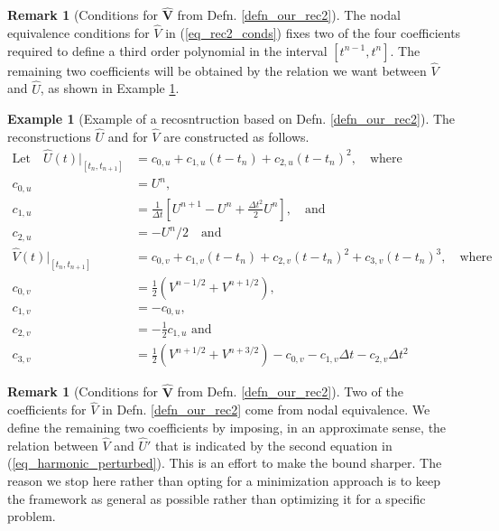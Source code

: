 \documentclass[12pt,a4paper]{article}
\numberwithin{equation}{section}
\theoremstyle{definition}
\newcommand{\qp}[1]{\left(#1\right)}
\newcommand{\qb}[1]{\left[#1\right]}
\newcommand{\rec}[1]{\widehat{{#1}}}
\newtheorem{Rem}[subsection]{Remark}
\newtheorem{Example}[subsection]{Example}
\begin{document}
\begin{Rem}[Conditions for $\hat{\textbf{V}}$ from Defn. \ref{defn_our_rec2}]
	The nodal equivalence conditions for $\rec{V}$ in (\ref{eq_rec2_conds}) fixes two of the four coefficients required to define a third order polynomial in the interval $\qb{t^{n-1}, t^n}$.  The remaining two coefficients will be obtained by the relation we want between $\rec{V}$ and $\rec{U}$, as shown in Example \ref{example:sample_rec}.  
\end{Rem}
\begin{Example}[Example of a recosntruction based on Defn. \ref{defn_our_rec2}]\label{example:sample_rec}
The reconstructions $\rec{U}$  and for $\rec{V}$ are constructed as follows.
\begin{equation}
\begin{aligned}
\text{Let}\quad\hat{U}\qp{t}|_{\qb{{t_n, t_{n+1}}}}&= c_{0,u} +c_{1,u}\qp{t-t_n} +c_{2,u}\qp{t-t_n}^2,\quad\text{where}\\
c_{0,u} &= U^n,\\
c_{1,u} &= \frac{1}{\Delta t}\qb{U^{n+1}-U^n + \frac{\Delta t^2}{2}U^n},\quad\text{and}\\
c_{2,u} &= -U^n/2\quad \text{and}\\
\hat{V}\qp{t}|_{\qb{{t_n, t_{n+1}}}}&= c_{0,v} +c_{1,v}\qp{t-t_n} +c_{2,v}\qp{t-t_n}^2+c_{3,v}\qp{t-t_n}^3,\quad\text{where}\\
c_{0,v} &=\frac{1}{2}\qp{V^{n-1/2}+V^{n+1/2} },\\
c_{1,v} &= -c_{0,u},\\
c_{2,v} &= -\frac{1}{2}c_{1,u}\text{  and}\\
c_{3,v} &= \frac{1}{2}\qp{V^{n+1/2}+V^{n+3/2} }-c_{0,v}- c_{1,v}\Delta t- c_{2,v}\Delta t^2
\end{aligned}
\end{equation}
\end{Example}



\begin{Rem}[Conditions for $\hat{\textbf{V}}$ from Defn. \ref{defn_our_rec2}]
Two of the coefficients for $\rec{V}$ in Defn. \ref{defn_our_rec2} come from nodal equivalence.  We define the remaining two coefficients  by imposing, in an approximate sense, the relation between $\rec{V}$ and $\rec{U}'$ that is indicated by the second equation in (\ref{eq_harmonic_perturbed}).  This is an effort to make the bound sharper. The reason we stop here rather than opting for a minimization approach is to keep the framework as general as possible rather than optimizing it for a specific problem.
\end{Rem}
\end{document}
